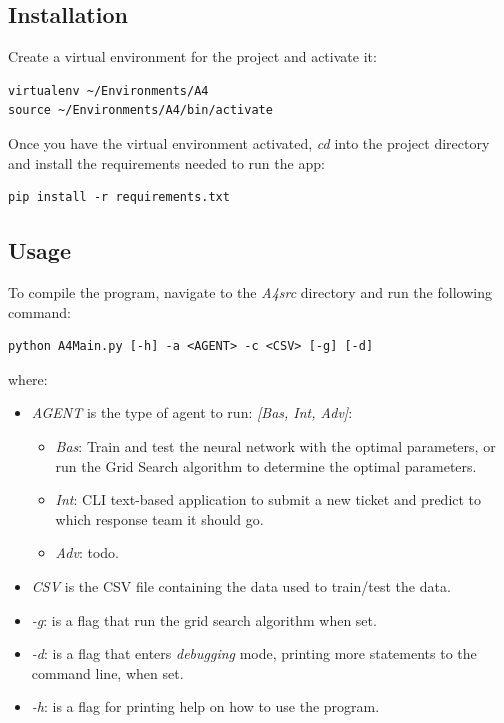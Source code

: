 \documentclass[letterpaper,12pt]{article}
\begin{document}
\subsection{Installation}

Create a virtual environment for the project and activate it:

\begin{lstlisting}
virtualenv ~/Environments/A4
source ~/Environments/A4/bin/activate
\end{lstlisting}

Once you have the virtual environment activated, \textit{cd} into the project directory and install the requirements needed to run the app:

\begin{lstlisting}
pip install -r requirements.txt
\end{lstlisting}

\subsection{Usage}

To compile the program, navigate to the \textit{A4src} directory and run the following command:

\begin{lstlisting}
python A4Main.py [-h] -a <AGENT> -c <CSV> [-g] [-d]
\end{lstlisting}

where:

\begin{itemize}
    \item \textit{AGENT} is the type of agent to run: \textit{[Bas, Int, Adv]}:
    \begin{itemize}
        \item \textit{Bas}: Train and test the neural network with the optimal parameters, or run the Grid Search algorithm to determine the optimal parameters.
        \item \textit{Int}: CLI text-based application to submit a new ticket and predict to which response team it should go.
        \item \textit{Adv}: todo.
    \end{itemize}
    \item \textit{CSV} is the CSV file containing the data used to train/test the data.
    \item \textit{-g}: is a flag that run the grid search algorithm when set.
    \item \textit{-d}: is a flag that enters \textit{debugging} mode, printing more statements to the command line, when set.
    \item \textit{-h}: is a flag for printing help on how to use the program.
\end{itemize}
\end{document}
